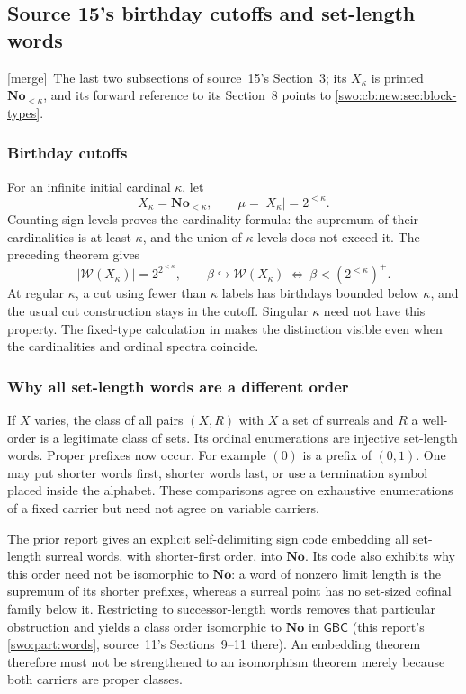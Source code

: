 \documentclass[11pt]{article}
\theoremstyle{definition}
\theoremstyle{remark}
\newcommand{\No}{\mathbf{No}}
\newcommand{\WO}{\mathcal W}
\newcommand{\emb}{\hookrightarrow}
\newcommand{\GBC}{\mathsf{GBC}}
\newcommand{\merge}{\textsf{[merge]}}
\begin{document}

\subsection{Source 15's birthday cutoffs and set-length words}
\label{swo:vi:sub:cb-base}

\merge\ The last two subsections of source~15's Section~3; its $X_\kappa$ is
printed $\No_{<\kappa}$, and its forward reference to its Section~8 points to
\cref{swo:cb:new:sec:block-types}.

\subsubsection{Birthday cutoffs}

For an infinite initial cardinal $\kappa$, let
\[
 X_\kappa=\No_{<\kappa},\qquad \mu=|X_\kappa|=2^{<\kappa}.
\]
Counting sign levels proves the cardinality formula: the supremum of their
cardinalities is at least $\kappa$, and the union of $\kappa$ levels does
not exceed it. The preceding theorem gives
\[
 |\WO(X_\kappa)|=2^{2^{<\kappa}},\qquad
 \beta\emb\WO(X_\kappa)\ \Longleftrightarrow\ 
 \beta<(2^{<\kappa})^+.
\]
At regular $\kappa$, a cut using fewer than $\kappa$ labels has birthdays
bounded below $\kappa$, and the usual cut construction stays in the
cutoff. Singular $\kappa$ need not have this property. The fixed-type
calculation in \Cref{swo:cb:sec:fixed} makes the distinction visible even
when the cardinalities and ordinal spectra coincide.

\subsubsection{Why all set-length words are a different order}

If $X$ varies, the class of all pairs $(X,R)$ with $X$ a set of surreals
and $R$ a well-order is a legitimate class of sets. Its ordinal
enumerations are injective set-length words. Proper prefixes now occur.
For example $(0)$ is a prefix of $(0,1)$. One may put shorter words first,
shorter words last, or use a termination symbol placed inside the alphabet.
These comparisons agree on exhaustive enumerations of a fixed carrier but
need not agree on variable carriers.

The prior report gives an explicit self-delimiting sign code embedding all
set-length surreal words, with shorter-first order, into $\No$. Its code
also exhibits why this order need not be isomorphic to $\No$: a word of
nonzero limit length is the supremum of its shorter prefixes, whereas a
surreal point has no set-sized cofinal family below it. Restricting to
successor-length words removes that particular obstruction and yields
a class order isomorphic to $\No$ in $\GBC$ (this report's
\cref{swo:part:words}, source~11's Sections~9--11 there).
An embedding theorem therefore must not be strengthened to an isomorphism
theorem merely because both carriers are proper classes.
\end{document}
